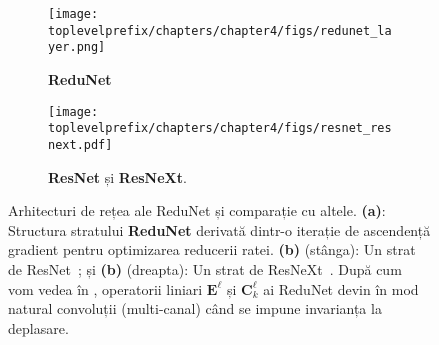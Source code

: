 \documentclass[../../book-main_ro.tex]{subfiles}
\begin{document}
\begin{figure}[t]
    \begin{subfigure}[t]{0.35\textwidth}
        \centering
        \texttt{[image: \\toplevelprefix/chapters/chapter4/figs/redunet\_layer.png]}
        \caption{\textbf{ReduNet}}
    \end{subfigure}
    \hfill 
    \begin{subfigure}[t]{0.6\textwidth}
        \centering
        \texttt{[image: \\toplevelprefix/chapters/chapter4/figs/resnet\_resnext.pdf]}
        \caption{\textbf{ResNet} și \textbf{ResNeXt}.}
    \end{subfigure}
    \caption{\small Arhitecturi de rețea ale ReduNet și comparație cu altele. \textbf{(a)}: Structura stratului \textbf{ReduNet} derivată dintr-o iterație de ascendență gradient pentru optimizarea reducerii ratei. \textbf{(b)} (stânga): Un strat de ResNet~\cite{he2016deep}; și \textbf{(b)} (dreapta): Un strat de ResNeXt~\cite{ResNEXT}. După cum vom vedea în , operatorii liniari $\bm E^\ell$ și $\bm{C}_k^\ell$ ai ReduNet devin în mod natural convoluții (multi-canal) când se impune invarianța la deplasare.}
    \label{fig:arch-ReduNet}
\end{figure}
\end{document}
